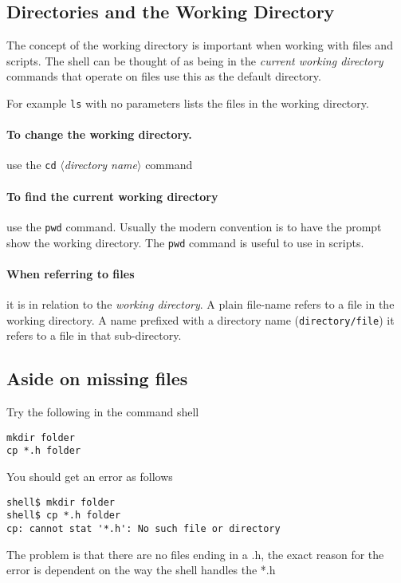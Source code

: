 \documentclass{article}
\begin{document}
\subsection{Directories and the Working Directory}
The concept of the working directory is important when working with
files and scripts.  The shell can be thought of as being in the
\emph{current working directory} commands that operate on files use
this as the default directory.

For example \texttt{ls} with no parameters lists the files in the
working directory.

\paragraph{To change the working directory.}  use the \texttt{cd}
$\langle$\emph{directory name}$\rangle$ command

\paragraph{To find the current working directory} use the
\texttt{pwd} command.  Usually the modern convention is to have the
prompt show the working directory.  The \texttt{pwd} command is
useful to use in scripts.

\paragraph{When referring to files} it is in relation to the
\emph{working directory}.
A plain file-name refers to a file in the working directory.  A name
prefixed with a directory name (\texttt{directory/file}) it refers to
a file in that sub-directory.

\subsection{Aside on missing files}
Try the following in the command shell
\begin{verbatim}
mkdir folder
cp *.h folder
\end{verbatim}
You should get an error as follows
\begin{verbatim}
shell$ mkdir folder
shell$ cp *.h folder
cp: cannot stat '*.h': No such file or directory
\end{verbatim}
The problem is that there are no files ending in a \textsf{.h}, the
exact reason for the error is dependent on the way the shell handles
the \textsf{*.h}
\end{document}
